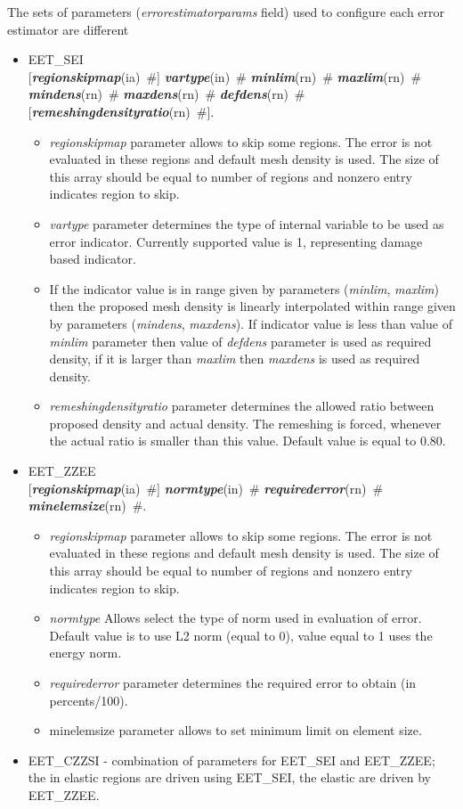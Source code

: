 \documentclass[draft]{article}
\newcommand{\param}[1]{{\em #1}}
\newcommand{\keywordnotype}[1]{\mbox{{\it{\bf{#1}}}}}
\newcommand{\keyword}[2]{\mbox{{\keywordnotype{#1}\tiny (#2)}}}
\newcommand{\field}[2]{\mbox{\keyword{#1}{#2}~\#}}
\newcommand{\optField}[2]{\mbox{[\field{#1}{#2}]}}
\begin{document}
The sets of parameters (\param{errorestimatorparams} field) used to
configure each error estimator are different 
\begin{itemize}
\item
EET\_SEI\\ \optField{regionskipmap}{ia} \field{vartype}{in}
\field{minlim}{rn} \field{maxlim}{rn}\\ \field{mindens}{rn}
\field{maxdens}{rn} \field{defdens}{rn}\\
\optField{remeshingdensityratio}{rn}.
\begin{itemize}
\item \param{regionskipmap} parameter allows to skip some regions. The
error is not evaluated in these regions and default mesh density is
used. The size of this array should be equal to number of regions and
nonzero entry indicates region to skip.
\item \param{vartype} parameter determines the type of internal
variable to be used as error indicator. Currently supported value is
1, representing damage based indicator.
\item If the indicator value is in range given by parameters (\param{minlim},
 \param{maxlim}) then the proposed mesh density is linearly
interpolated within range given by parameters (\param{mindens}, \param{maxdens}). If
indicator value is less than value of \param{minlim} parameter then
value of \param{defdens} parameter is used as 
required density, if it is larger than \param{maxlim} then
\param{maxdens} is used as required density. 
\item
\param{remeshingdensityratio} parameter determines the allowed ratio
between proposed density and actual density.
The remeshing is forced, whenever the actual ratio is smaller than
this value. Default value is equal to 0.80.
\end{itemize}
\item
EET\_ZZEE\\ \optField{regionskipmap}{ia} \field{normtype}{in}
\field{requirederror}{rn}\\ \field{minelemsize}{rn}.
\begin{itemize}
\item \param{regionskipmap} parameter allows to skip some regions. The
error is not evaluated in these regions and default mesh density is
used. The size of this array should be equal to number of regions and
nonzero entry indicates region to skip.
\item \param{normtype} Allows select the type of norm used in
evaluation of error. Default value is to use L2 norm (equal to 0),
value equal to 1 uses the energy norm.
\item \param{requirederror} parameter determines the required error to
obtain (in percents/100).
\item{minelemsize} parameter allows to set minimum limit on element size.
\end{itemize}
\item
EET\_CZZSI - combination of parameters for EET\_SEI and EET\_ZZEE; the
in elastic regions are driven using EET\_SEI, the elastic are driven
by EET\_ZZEE.
\end{itemize}
\end{document}
